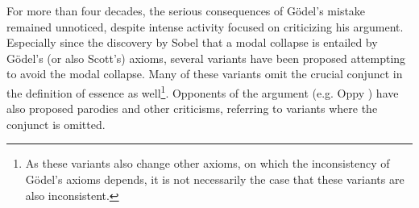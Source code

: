 \documentclass{article}
\begin{document}
For more than four decades, the serious consequences of G\"odel's mistake remained unnoticed, despite intense activity focused on criticizing his argument. Especially since the discovery by Sobel \cite{Sobel} that a modal collapse is entailed by G\"odel's (or also Scott's) axioms, several variants have been proposed \cite{Anderson,AndersonGettings1968,Hajek,Hajek2,Hajek3,Bjordal} attempting to avoid the modal collapse. Many of these variants omit the crucial conjunct in the definition of essence as well\footnote{As these variants also change other axioms, on which the inconsistency of G\"odel's axioms depends, it is not necessarily the case that these variants are also inconsistent.}. Opponents of the argument (e.g. Oppy \cite[p.226/227]{Oppy1996} \cite[p.364]{Oppy2000} \cite[p.1068]{Oppy2008}) have also proposed parodies and other criticisms, referring to variants where the conjunct is omitted.







\end{document}
